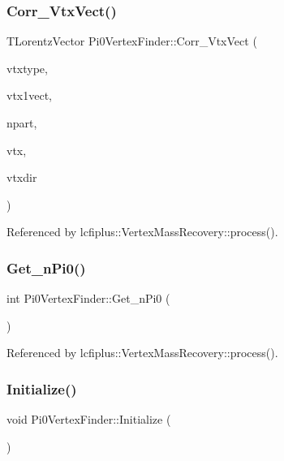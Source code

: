 \subsubsection{Corr\+\_\+\+Vtx\+Vect()}
{\footnotesize\ttfamily T\+Lorentz\+Vector Pi0\+Vertex\+Finder\+::\+Corr\+\_\+\+Vtx\+Vect (\begin{DoxyParamCaption}\item[{int}]{vtxtype,  }\item[{T\+Lorentz\+Vector}]{vtx1vect,  }\item[{int $\ast$}]{npart,  }\item[{T\+Vector3}]{vtx,  }\item[{T\+Vector3}]{vtxdir }\end{DoxyParamCaption})}



Referenced by lcfiplus\+::\+Vertex\+Mass\+Recovery\+::process().

\mbox{\label{classlcfiplus_1_1Pi0VertexFinder_a9b4087ec457fd93373f470d6b9e5caf5}} 
\subsubsection{Get\+\_\+n\+Pi0()}
{\footnotesize\ttfamily int Pi0\+Vertex\+Finder\+::\+Get\+\_\+n\+Pi0 (\begin{DoxyParamCaption}{ }\end{DoxyParamCaption})}



Referenced by lcfiplus\+::\+Vertex\+Mass\+Recovery\+::process().

\mbox{\label{classlcfiplus_1_1Pi0VertexFinder_a010fb6d33fd801f5be3a510f32479189}} 
\subsubsection{Initialize()}
{\footnotesize\ttfamily void Pi0\+Vertex\+Finder\+::\+Initialize (\begin{DoxyParamCaption}{ }\end{DoxyParamCaption})}



